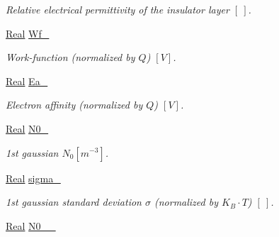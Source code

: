 \begin{DoxyCompactItemize}
\begin{DoxyCompactList}\small\item\em Relative electrical permittivity of the insulator layer $ \left[ ~ \right] $. \end{DoxyCompactList}\item 
\hypertarget{classParamList_a9121165703c9ef6b60fe469701a48fad}{\hyperlink{typedefs_8h_a060b837c3b4486ee35317744156f3da2}{Real} \hyperlink{classParamList_a9121165703c9ef6b60fe469701a48fad}{Wf\-\_\-}}\label{classParamList_a9121165703c9ef6b60fe469701a48fad}

\begin{DoxyCompactList}\small\item\em Work-\/function (normalized by $ Q $) $ \left[ V \right] $. \end{DoxyCompactList}\item 
\hypertarget{classParamList_aed555e87b2a431b6ecabaf17813ed289}{\hyperlink{typedefs_8h_a060b837c3b4486ee35317744156f3da2}{Real} \hyperlink{classParamList_aed555e87b2a431b6ecabaf17813ed289}{Ea\-\_\-}}\label{classParamList_aed555e87b2a431b6ecabaf17813ed289}

\begin{DoxyCompactList}\small\item\em Electron affinity (normalized by $ Q $) $ \left[ V \right] $. \end{DoxyCompactList}\item 
\hypertarget{classParamList_aa51672586248c54289ad6ac1a5d3c274}{\hyperlink{typedefs_8h_a060b837c3b4486ee35317744156f3da2}{Real} \hyperlink{classParamList_aa51672586248c54289ad6ac1a5d3c274}{N0\-\_\-}}\label{classParamList_aa51672586248c54289ad6ac1a5d3c274}

\begin{DoxyCompactList}\small\item\em 1st gaussian $ N_0 \left[ m^{-3} \right] $. \end{DoxyCompactList}\item 
\hypertarget{classParamList_a37293181f9beea97f75b133deb9d9119}{\hyperlink{typedefs_8h_a060b837c3b4486ee35317744156f3da2}{Real} \hyperlink{classParamList_a37293181f9beea97f75b133deb9d9119}{sigma\-\_\-}}\label{classParamList_a37293181f9beea97f75b133deb9d9119}

\begin{DoxyCompactList}\small\item\em 1st gaussian standard deviation $ \sigma $ (normalized by $ K_B \cdot T $) $ \left[ ~ \right] $. \end{DoxyCompactList}\item 
\hypertarget{classParamList_a5cd86383f9ae39d6a8851c5b470051eb}{\hyperlink{typedefs_8h_a060b837c3b4486ee35317744156f3da2}{Real} \hyperlink{classParamList_a5cd86383f9ae39d6a8851c5b470051eb}{N0\-\_\-\_\-}}\label{classParamList_a5cd86383f9ae39d6a8851c5b470051eb}


\end{DoxyCompactItemize}
